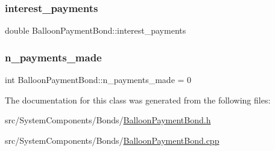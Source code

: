 \mbox{\label{classBalloonPaymentBond_ac73d3ec9b640614f454d8cc8bd1ebbc3_ac73d3ec9b640614f454d8cc8bd1ebbc3}} 
\subsubsection{\texorpdfstring{interest\+\_\+payments}{interest\_payments}}
{\footnotesize\ttfamily double Balloon\+Payment\+Bond\+::interest\+\_\+payments\hspace{0.3cm}{\ttfamily [private]}}

\mbox{\label{classBalloonPaymentBond_a82255e2f56110503d126fefbbc192d67_a82255e2f56110503d126fefbbc192d67}} 
\subsubsection{\texorpdfstring{n\+\_\+payments\+\_\+made}{n\_payments\_made}}
{\footnotesize\ttfamily int Balloon\+Payment\+Bond\+::n\+\_\+payments\+\_\+made = 0\hspace{0.3cm}{\ttfamily [private]}}



The documentation for this class was generated from the following files\+:\begin{DoxyCompactItemize}
\item 
src/\+System\+Components/\+Bonds/\mbox{\hyperlink{BalloonPaymentBond_8h}{Balloon\+Payment\+Bond.\+h}}\item 
src/\+System\+Components/\+Bonds/\mbox{\hyperlink{BalloonPaymentBond_8cpp}{Balloon\+Payment\+Bond.\+cpp}}\end{DoxyCompactItemize}
